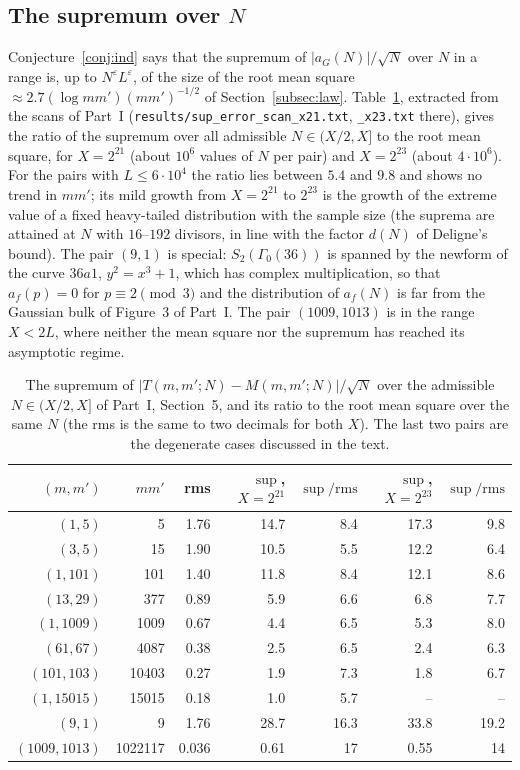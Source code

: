 ﻿\documentclass[11pt]{amsart}
\theoremstyle{remark}
\newcommand{\e}{\varepsilon}
\begin{document}
\subsection{The supremum over $N$}\label{subsec:sup}
Conjecture~\ref{conj:ind} says that the supremum of $|a_G(N)|/\sqrt N$ over $N$ in a range is, up to $N^\e L^\e$, of the size of the root mean square $\approx2.7(\log mm')(mm')^{-1/2}$ of Section~\ref{subsec:law}. Table~\ref{tab:sup}, extracted from the scans of Part~I (\texttt{results/sup\_error\_scan\_x21.txt}, \texttt{\_x23.txt} there), gives the ratio of the supremum over all admissible $N\in(X/2,X]$ to the root mean square, for $X=2^{21}$ (about $10^6$ values of $N$ per pair) and $X=2^{23}$ (about $4\cdot10^6$). For the pairs with $L\le6\cdot10^4$ the ratio lies between $5.4$ and $9.8$ and shows no trend in $mm'$; its mild growth from $X=2^{21}$ to $2^{23}$ is the growth of the extreme value of a fixed heavy-tailed distribution with the sample size (the suprema are attained at $N$ with $16$--$192$ divisors, in line with the factor $d(N)$ of Deligne's bound). The pair $(9,1)$ is special: $S_2(\Gamma_0(36))$ is spanned by the newform of the curve $36a1$, $y^2=x^3+1$, which has complex multiplication, so that $a_f(p)=0$ for $p\equiv2\pmod3$ and the distribution of $a_f(N)$ is far from the Gaussian bulk of Figure~3 of Part~I. The pair $(1009,1013)$ is in the range $X<2L$, where neither the mean square nor the supremum has reached its asymptotic regime.

\begin{table}[H]
\centering
\small
\begin{tabular}{rrrrrrr}
\hline
$(m,m')$ & $mm'$ & rms & $\sup$, $X=2^{21}$ & $\sup/\mathrm{rms}$ & $\sup$, $X=2^{23}$ & $\sup/\mathrm{rms}$\\
\hline
$(1,5)$ & 5 & 1.76 & 14.7 & 8.4 & 17.3 & 9.8\\
$(3,5)$ & 15 & 1.90 & 10.5 & 5.5 & 12.2 & 6.4\\
$(1,101)$ & 101 & 1.40 & 11.8 & 8.4 & 12.1 & 8.6\\
$(13,29)$ & 377 & 0.89 & 5.9 & 6.6 & 6.8 & 7.7\\
$(1,1009)$ & 1009 & 0.67 & 4.4 & 6.5 & 5.3 & 8.0\\
$(61,67)$ & 4087 & 0.38 & 2.5 & 6.5 & 2.4 & 6.3\\
$(101,103)$ & 10403 & 0.27 & 1.9 & 7.3 & 1.8 & 6.7\\
$(1,15015)$ & 15015 & 0.18 & 1.0 & 5.7 & -- & --\\
$(9,1)$ & 9 & 1.76 & 28.7 & 16.3 & 33.8 & 19.2\\
$(1009,1013)$ & 1022117 & 0.036 & 0.61 & 17 & 0.55 & 14\\
\hline
\end{tabular}
\medskip
\caption{The supremum of $|T(m,m';N)-M(m,m';N)|/\sqrt N$ over the admissible $N\in(X/2,X]$ of Part~I, Section~5, and its ratio to the root mean square over the same $N$ (the rms is the same to two decimals for both $X$). The last two pairs are the degenerate cases discussed in the text.}
\label{tab:sup}
\end{table}
\end{document}
